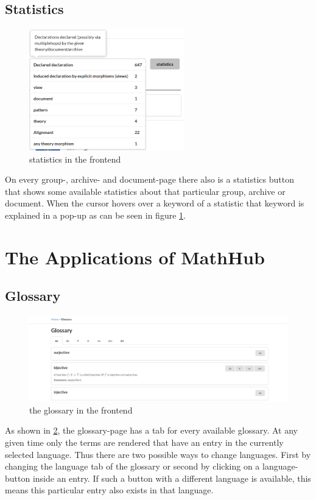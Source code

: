 \documentclass[11pt,a4paper]{article}
\begin{document}
\subsection{Statistics}
\begin{figure}[H]
\centerline{\includegraphics[width=0.6\textwidth]{statistics.png}}
\caption{statistics in the frontend}
\label{fig:stats}
\end{figure}
On every group-, archive- and document-page there also is a statistics button that shows some available statistics about that particular group, archive or document.
When the cursor hovers over a keyword of a statistic that keyword is explained in a pop-up as can be seen in figure \ref{fig:stats}.

\section{The Applications of MathHub} \label{apps}
\subsection{Glossary}
\begin{figure}[H]
\includegraphics[width=1\textwidth]{glossary.png}
\caption{the glossary in the frontend}
\label{fig:glossary}
\end{figure}
As shown in \ref{fig:glossary}, the glossary-page has a tab for every available glossary.
At any given time only the terms are rendered that have an entry in the currently selected language.
Thus there are two possible ways to change languages.
First by changing the language tab of the glossary or second by clicking on a language-button inside an entry.
If such a button with a different language is available, this means this particular entry also exists in that language.
\end{document}
